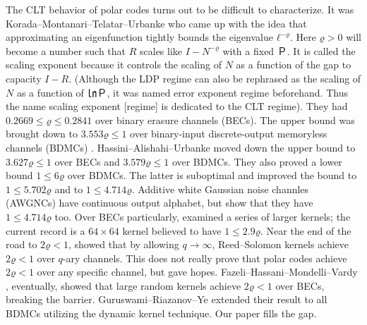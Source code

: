 \documentclass[openany]{amsbook}
\numberwithin{equation}{chapter}
\numberwithin{figure}{chapter}
\numberwithin{table}{chapter}
\theoremstyle{definition}	理dfn:Definition~?s			理exa:Example~?s
\theoremstyle{remark}		理cla:Claim~?s				理rem:Remark~?s
\begin{document}
	The CLT behavior of polar codes turns out to be difficult to characterize.
	It was Korada--Montanari--Telatar--Urbanke \cite{KMTU10} who came up with the idea
	that approximating an eigenfunction tightly bounds the eigenvalue $ℓ^{-ϱ}$.
	Here $ϱ>0$ will become a number such that
	$R$ scales like $I-N^{-ϱ}$ with a fixed $Ｐ$.
	It is called the scaling exponent because it controls
	the scaling of $N$ as a function of the gap to capacity $I-R$.
	(Although the LDP regime can also be rephrased as the scaling of $N$
	as a function of $㏑Ｐ$, it was named error exponent regime beforehand.
	Thus the name scaling exponent [regime] is dedicated to the CLT regime).
	They had $0.2669≤ϱ≤0.2841$ over binary erasure channels (BECs).
	The upper bound was brought down to $3.553ϱ≤1$ over
	binary-input discrete-output memoryless channels (BDMCs) \cite{GHU12}.
	Hassini--Alishahi--Urbanke \cite{HAU14} moved down the upper bound
	to $3.627ϱ≤1$ over BECs and $3.579ϱ≤1$ over BDMCs.
	They also proved a lower bound $1≤6ϱ$ over BDMCs.
	The latter is suboptimal and \cite{GB14,MHU16}
	improved the bound to $1≤5.702ϱ$ and to $1≤4.714ϱ$.
	Additive white Gaussian noise channles (AWGNCs) have continuous
	output alphabet, but \cite{FT17} show that they have $1≤4.714ϱ$ too.
	Over BECs particularly, \cite{FV14,YFV19} examined a series of larger kernels;
	the current record is a $64×64$ kernel believed to have $1≤2.9ϱ$.
	Near the end of the road to $2ϱ<1$, \cite{PU16} showed that by allowing $q→∞$,
	Reed--Solomon kernels achieve $2ϱ<1$ over $q$-ary channels.
	This does not really prove that polar codes achieve $2ϱ<1$
	over any specific channel, but gave hopes.
	Fazeli--Hassani--Mondelli--Vardy \cite{FHMV17,FHMV18,FHMV20}, eventually,
	showed that large random kernels achieve $2ϱ<1$ over BECs, breaking the barrier.
	Guruswami--Riazanov--Ye \cite{GRY19,GRY20} extended their result
	to all BDMCs utilizing the dynamic kernel technique.
	Our paper \cite{Hypotenuse21} fills the gap.
	
\end{document}
